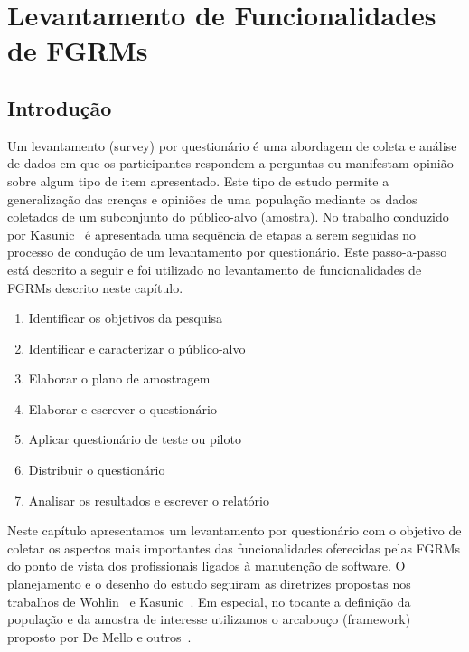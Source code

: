 \chapter{Levantamento de Funcionalidades de FGRMs}
\label{ch:pesquisa-profissionais}

\section{Introdução}
\label{sec:pesquisa-profissionais-intro}

Um levantamento (survey) por questionário é uma abordagem de coleta e análise de
dados em que os participantes respondem a perguntas ou manifestam opinião sobre
algum tipo de item apresentado. Este tipo de estudo permite a generalização das
crenças e opiniões de uma população mediante os dados coletados de um
subconjunto do público-alvo (amostra). No trabalho conduzido por
Kasunic~\cite{kasunic2005designing} é apresentada uma sequência de etapas a
serem seguidas no processo de condução de um levantamento por questionário. Este
passo-a-passo está descrito a seguir e foi utilizado no levantamento de
funcionalidades de FGRMs descrito neste capítulo.

\begin{enumerate}
    \item{Identificar os objetivos da pesquisa}
    \item{Identificar e caracterizar o público-alvo}
    \item{Elaborar o plano de amostragem}
    \item{Elaborar e escrever o questionário}
    \item{Aplicar questionário de teste ou piloto}
    \item{Distribuir o questionário}
    \item{Analisar os resultados e escrever o relatório}
\end{enumerate}

Neste capítulo apresentamos um levantamento por questionário com o objetivo de
coletar os aspectos mais importantes das funcionalidades oferecidas pelas FGRMs
do ponto de vista dos profissionais ligados à manutenção de software. O
planejamento e o desenho do estudo seguiram as diretrizes propostas nos
trabalhos de Wohlin~\cite{wohlin2012experimentation} e
Kasunic~\cite{kasunic2005designing}. Em especial, no tocante a definição da
população e da amostra de interesse utilizamos o arcabouço (framework) proposto
por De Mello e outros~\cite{de2015investigating, de2014towards}.

